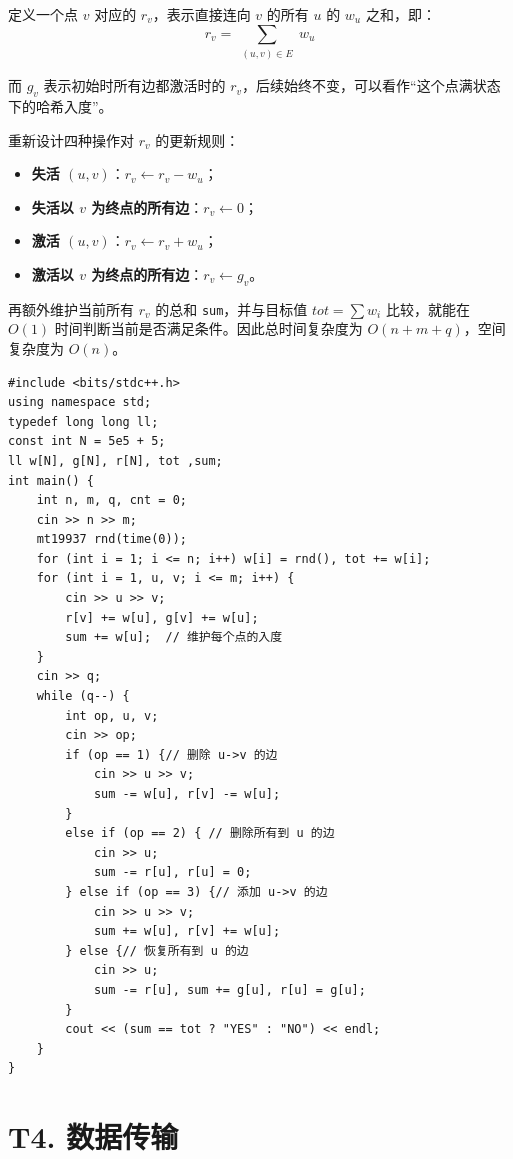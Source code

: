 \documentclass{book}
\newcommand{\code}[1]{\colorbox{codebg}{\texttt{#1}}}  %
\begin{document}
定义一个点 $v$ 对应的 $r_v$，表示直接连向 $v$ 的所有 $u$ 的 $w_u$ 之和，即：
\[
r_v=\sum_{\substack{(u,v)\in E}}w_u
\]

而 $g_v$ 表示初始时所有边都激活时的 $r_v$，后续始终不变，可以看作“这个点满状态下的哈希入度”。

重新设计四种操作对 $r_v$ 的更新规则：

\begin{itemize}[leftmargin=2em,itemsep=1pt,topsep=2pt,parsep=0pt,partopsep=0pt]
    \item \textbf{失活 $(u,v)$}：$r_v\leftarrow r_v-w_u$；
    \item \textbf{失活以 $v$ 为终点的所有边}：$r_v\leftarrow 0$；
    \item \textbf{激活 $(u,v)$}：$r_v\leftarrow r_v+w_u$；
    \item \textbf{激活以 $v$ 为终点的所有边}：$r_v\leftarrow g_v$。
\end{itemize}

再额外维护当前所有 $r_v$ 的总和 \code{sum}，并与目标值 $tot=\sum w_i$ 比较，就能在 $O(1)$ 时间判断当前是否满足条件。因此总时间复杂度为 $O(n+m+q)$，空间复杂度为 $O(n)$。
    \begin{lstlisting}[style = code]
#include <bits/stdc++.h>
using namespace std;
typedef long long ll;
const int N = 5e5 + 5;
ll w[N], g[N], r[N], tot ,sum;
int main() {
    int n, m, q, cnt = 0;
    cin >> n >> m;
    mt19937 rnd(time(0));
    for (int i = 1; i <= n; i++) w[i] = rnd(), tot += w[i];
    for (int i = 1, u, v; i <= m; i++) {
        cin >> u >> v;
        r[v] += w[u], g[v] += w[u];
        sum += w[u];  // 维护每个点的入度
    }
    cin >> q;
    while (q--) {
        int op, u, v;
        cin >> op;
        if (op == 1) {// 删除 u->v 的边
            cin >> u >> v;
            sum -= w[u], r[v] -= w[u];
        }
        else if (op == 2) { // 删除所有到 u 的边
            cin >> u;
            sum -= r[u], r[u] = 0;
        } else if (op == 3) {// 添加 u->v 的边
            cin >> u >> v;
            sum += w[u], r[v] += w[u];
        } else {// 恢复所有到 u 的边
            cin >> u;
            sum -= r[u], sum += g[u], r[u] = g[u];
        }
        cout << (sum == tot ? "YES" : "NO") << endl;
    }
}\end{lstlisting}


\newpage

\section{T4. 数据传输} %
    
\end{document}
